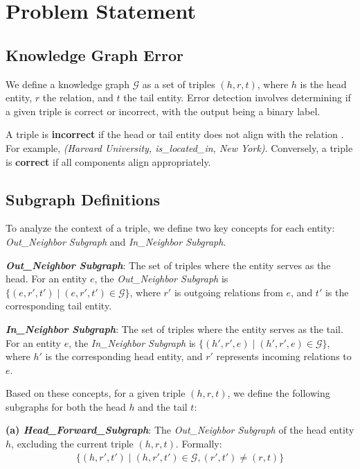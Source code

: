 \section{Problem Statement}

\subsection{Knowledge Graph Error}

We define a knowledge graph \( \mathcal{G} \) as a set of triples \( (h, r, t) \), 
where \( h \) is the head entity, \( r \) the relation, and \( t \) the tail entity. Error detection involves determining if a given triple is correct or incorrect, with the output being a binary label.

A triple is \textbf{incorrect} if the head or tail entity does not align with the relation \cite{error}. For example, \textit{(Harvard University, is\_located\_in, New York)}. Conversely, a triple is \textbf{correct} if all components align appropriately. 


\subsection{Subgraph Definitions}

To analyze the context of a triple, we define two key concepts for each entity: \textit{Out\_Neighbor Subgraph} and \textit{In\_Neighbor Subgraph}.

\noindent\textbf{\textit{Out\_Neighbor Subgraph}}: The set of triples where the entity serves as the head. For an entity \( e \), the \textit{Out\_Neighbor Subgraph} is \( \{(e, r', t') \mid (e, r', t') \in \mathcal{G}\} \), where \( r' \) is outgoing relations from \( e \), and \( t' \) is the corresponding tail entity.

\noindent\textbf{\textit{In\_Neighbor Subgraph}}: The set of triples where the entity serves as the tail. For an entity \( e \), the \textit{In\_Neighbor Subgraph} is \( \{(h', r', e) \mid (h', r', e) \in \mathcal{G}\} \), where \( h' \) is the corresponding head entity, and \( r' \) represents incoming relations to \( e \).

Based on these concepts, for a given triple \( (h, r, t) \), we define the following subgraphs for both the head \( h \) and the tail \( t \):

\noindent\textbf{(a) \textit{Head\_Forward\_Subgraph}}: The \textit{Out\_Neighbor Subgraph} of the head entity \( h \), excluding the current triple \( (h, r, t) \). Formally:
\begin{align}
   \{(h, r', t') \mid (h, r', t') \in \mathcal{G}, (r', t') \neq (r, t)\}
\end{align}
   
